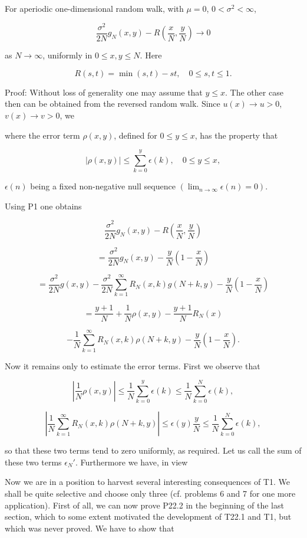 For aperiodic one-dimensional random walk, with $\mu = 0$, $0 < \sigma^2 < \infty$,

$$\frac{\sigma^2}{2N} g_N(x,y) - R\left(\frac{x}{N}, \frac{y}{N}\right) \to 0$$

as $N \to \infty$, uniformly in $0 \leq x,y \leq N$. Here

$$R(s,t) = \min(s,t) - st, \quad 0 \leq s,t \leq 1.$$

Proof: Without loss of generality one may assume that $y \leq x$. The other case then can be obtained from the reversed random walk. Since $u(x) \to u > 0$, $v(x) \to v > 0$, we

where the error term $\rho(x,y)$, defined for $0 \leq y \leq x$, has the property that

$$|\rho(x,y)| \leq \sum_{k=0}^{y} \epsilon(k), \quad 0 \leq y \leq x,$$

$\epsilon(n)$ being a fixed non-negative null sequence $(\lim_{n \to \infty} \epsilon(n) = 0)$.

Using P1 one obtains

$$\frac{\sigma^2}{2N} g_N(x,y) - R\left(\frac{x}{N}, \frac{y}{N}\right)$$

$$= \frac{\sigma^2}{2N} g_N(x,y) - \frac{y}{N}\left(1 - \frac{x}{N}\right)$$

$$= \frac{\sigma^2}{2N} g(x,y) - \frac{\sigma^2}{2N} \sum_{k=1}^{\infty} R_N(x,k)g(N+k,y) - \frac{y}{N}\left(1 - \frac{x}{N}\right)$$

$$= \frac{y+1}{N} + \frac{1}{N}\rho(x,y) - \frac{y+1}{N}R_N(x)$$

$$- \frac{1}{N} \sum_{k=1}^{\infty} R_N(x,k)\rho(N+k,y) - \frac{y}{N}\left(1 - \frac{x}{N}\right).$$

Now it remains only to estimate the error terms. First we observe that

$$\left|\frac{1}{N}\rho(x,y)\right| \leq \frac{1}{N} \sum_{k=0}^{y} \epsilon(k) \leq \frac{1}{N} \sum_{k=0}^{N} \epsilon(k),$$

$$\left|\frac{1}{N} \sum_{k=1}^{\infty} R_N(x,k)\rho(N+k,y)\right| \leq \epsilon(y)\frac{y}{N} \leq \frac{1}{N} \sum_{k=0}^{N} \epsilon(k),$$

so that these two terms tend to zero uniformly, as required. Let us call the sum of these two terms $\epsilon_N'$. Furthermore we have, in view

Now we are in a position to harvest several interesting consequences of T1. We shall be quite selective and choose only three (cf. problems 6 and 7 for one more application). First of all, we can now prove P22.2 in the beginning of the last section, which to some extent motivated the development of T22.1 and T1, but which was never proved. We have to show that

